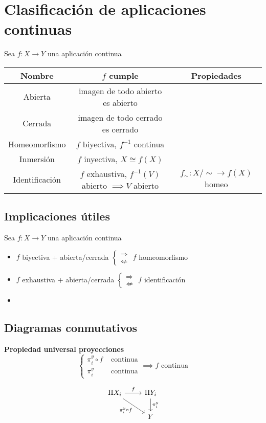 \documentclass[leqno]{article}
\begin{document}
\section{Clasificación de aplicaciones continuas}
Sea $f:X\to Y$ una aplicación continua
\begin{center}
\begin{tabular}{|c|c|c|}
\hline
\textbf{Nombre}  & \textbf{$f$ cumple} & \textbf{Propiedades} \\
\hline
Abierta & imagen de todo abierto es abierto & \\
\hline
Cerrada & imagen de todo cerrado es cerrado & \\
\hline
Homeomorfismo & $f$ biyectiva,  $f^{-1}$ continua & \\
\hline
Inmersión & $f$ inyectiva, $X\cong f(X)$  &   \\
\hline
Identificación & $f$ exhaustiva, $ f^{-1}(V)$ abierto $\implies V$ abierto & $f_\sim : X / \sim \to  f(X)$ homeo \\
\hline

\end{tabular}
\end{center}
\subsection{Implicaciones útiles}
Sea $f:X\to Y$ una aplicación continua
\begin{itemize}[topsep=-6pt, itemsep=0pt]
  \item $f$ biyectiva + abierta/cerrada $\begin{cases}
    \Rightarrow \\ \not\Leftarrow
  \end{cases}$ $f$ homeomorfismo
  \item $f$ exhaustiva + abierta/cerrada  $\begin{cases} \Rightarrow \\ \not\Leftarrow \end{cases}$ $f$ identificación
  \item 
\end{itemize}

\subsection{Diagramas conmutativos}
\begin{minipage}{0.7\textwidth}
\textbf{Propiedad universal proyecciones}
\[
\begin{cases}
  \pi^y_i\circ f & \text{ continua} \\
  \pi^y_i & \text{ continua}
\end{cases}
\implies f \text{ continua}
\] 
\end{minipage}
\begin{minipage}{0.3\textwidth}
\[\begin{tikzcd}
	{\Pi X_i} & {\Pi Y_i} \\
	& Y
	\arrow["f", from=1-1, to=1-2]
	\arrow["{\pi^y_i}", from=1-2, to=2-2]
	\arrow["{\pi^y_i\circ f}"', from=1-1, to=2-2]
\end{tikzcd}\]
\end{minipage}
\end{document}
